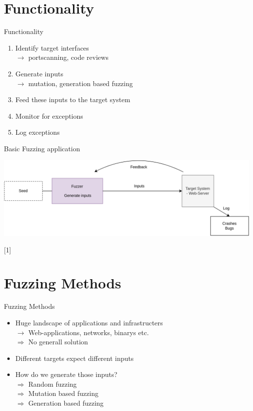 \documentclass{beamer}
\begin{document}
\section{Functionality}
\begin{frame}{Functionality}
\begin{enumerate}
 \item Identify target interfaces\\
 $\rightarrow$ portscanning, code reviews
 \item Generate inputs\\
 $\rightarrow$ mutation, generation based fuzzing
 \item Feed these inputs to the target system
 \item Monitor for exceptions
 \item Log exceptions
\end{enumerate}

\end{frame}
\begin{frame}{Basic Fuzzing application}
\vspace{15mm}
\begin{center}
  \includegraphics[scale=0.15]{basicfuzz.png}
\end{center}
\vspace{15mm}
\small{[1]}
\end{frame}
\section{Fuzzing Methods}
\begin{frame}{Fuzzing Methods}
 \begin{itemize}
  \item Huge landscape of applications and infrastructers\\
  $\rightarrow$ Web-applications, networks, binarys etc.\\
  $\Rightarrow$ No generall solution
  \item Different targets expect different inputs
  \item How do we generate those inputs?\\
  $\Rightarrow$ Random fuzzing\\
  $\Rightarrow$ Mutation based fuzzing\\
  $\Rightarrow$ Generation based fuzzing
 \end{itemize}

\end{frame}
\end{document}

